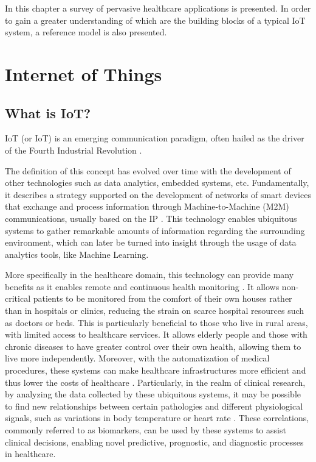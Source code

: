 In this chapter a survey of pervasive healthcare applications is presented. In order to gain a greater understanding of which are the building blocks of a typical \acf{IoT} system, a reference model is also presented.

\section{Internet of Things}

\subsection{What is IoT?}

\acl{IoT} (or \acs{IoT}) is an emerging communication paradigm, often hailed as the driver of the Fourth Industrial Revolution \cite{Aceto2020}. \bigskip

The definition of this concept has evolved over time with the development of other technologies such as data analytics, embedded systems, etc. Fundamentally, it describes a strategy supported on the development of networks of smart devices that exchange and process information through Machine-to-Machine (M2M) communications, usually based on the \acf{IP} \cite{Baker2017}. This technology enables ubiquitous systems to gather remarkable amounts of information regarding the surrounding environment, which can later be turned into insight through the usage of data analytics tools, like Machine Learning. \bigskip

More specifically in the healthcare domain, this technology can provide many benefits as it enables remote and continuous health monitoring \cite{Doukas2012, Wu2020, Fan2014}. It allows non-critical patients to be monitored from the comfort of their own houses rather than in hospitals or clinics, reducing the strain on scarce hospital resources such as doctors or beds. This is particularly beneficial to those who live in rural areas, with limited access to healthcare services. It allows elderly people and those with chronic diseases to have greater control over their own health, allowing them to live more independently. Moreover, with the automatization of medical procedures, these systems can make healthcare infrastructures more efficient and thus lower the costs of healthcare \cite{Catarinucci2015, Adame2018}. Particularly, in the realm of clinical research, by analyzing the data collected by these ubiquitous systems, it may be possible to find new relationships between certain pathologies and different physiological signals, such as variations in body temperature or heart rate \cite{Choi2016}. These correlations, commonly referred to as biomarkers, can be used by these systems to assist clinical decisions, enabling novel predictive, prognostic, and diagnostic processes in healthcare.

